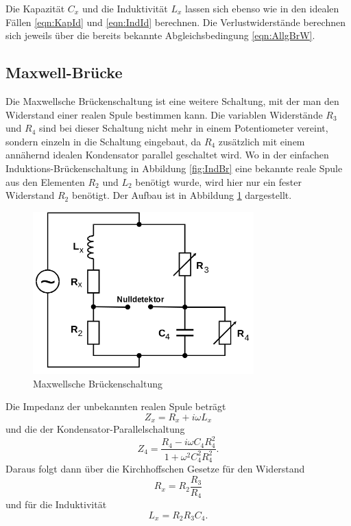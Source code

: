 Die Kapazität $C_x$ und die Induktivität $L_x$ lassen sich ebenso wie
in den idealen Fällen \eqref{eqn:KapId} und \eqref{eqn:IndId} berechnen.
Die Verlustwiderstände berechnen sich jeweils über die bereits bekannte
Abgleichsbedingung \eqref{eqn:AllgBrW}.


\subsection{Maxwell-Brücke}

Die Maxwellsche Brückenschaltung ist eine weitere Schaltung, mit der man
den Widerstand einer realen Spule bestimmen kann.
Die variablen Widerstände $R_3$ und $R_4$ sind bei dieser Schaltung nicht mehr
in einem Potentiometer vereint, sondern einzeln in die Schaltung eingebaut,
da $R_4$ zusätzlich mit einem annähernd idealen Kondensator
parallel geschaltet wird.
Wo in der einfachen Induktions-Brückenschaltung in Abbildung \ref{fig:IndBr}
eine bekannte reale Spule aus den Elementen $R_2$ und $L_2$ benötigt wurde,
wird hier nur ein fester Widerstand $R_2$ benötigt. Der Aufbau ist in
Abbildung \ref{fig:MaxBr} dargestellt.

\begin{figure}[h]
  \centering
  \includegraphics[height=6.25cm]{MaxBr.png}
  \caption{Maxwellsche Brückenschaltung}
  \label{fig:MaxBr}
\end{figure}

Die Impedanz der unbekannten realen Spule beträgt
\begin{equation}
  Z_x = R_x + i\omega L_x
\end{equation}
und die der Kondensator-Parallelschaltung
\begin{equation}
  Z_4 = \frac{R_4 - i\omega C_4R_4^2}{1 + \omega^2 C_4^2R_4^2} .
\end{equation}
Daraus folgt dann über die Kirchhoffschen Gesetze für den Widerstand
\begin{equation}
  R_x = R_2 \frac{R_3}{R_4}
\end{equation}
und für die Induktivität
\begin{equation}
  L_x = R_2 R_3 C_4 .
\end{equation}



